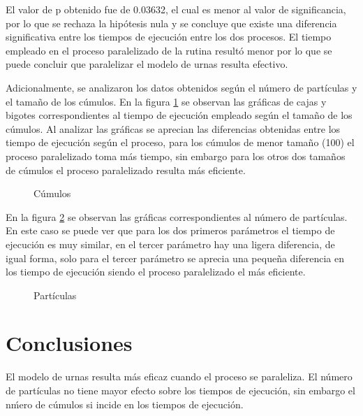 \documentclass{article}
\begin{document}
El valor de p obtenido fue de 0.03632, el cual es menor al valor de significancia, por lo que se rechaza la hip\'otesis nula y se concluye que existe una diferencia significativa entre los tiempos de ejecuci\'on entre los dos procesos.  El tiempo empleado en el proceso paralelizado de la rutina result\'o menor por lo que se puede concluir que paralelizar el modelo de urnas resulta efectivo.

Adicionalmente, se analizaron los datos obtenidos seg\'un el n\'umero de part\'iculas y el tama\~no de los c\'umulos.  En la figura \ref{f1} se observan las gr\'aficas de cajas y bigotes correspondientes al tiempo de ejecuci\'on empleado seg\'un el tama\~no de los c\'umulos.  Al analizar las gr\'aficas se aprecian las diferencias obtenidas entre los tiempo de ejecuci\'on seg\'un el proceso, para los c\'umulos de menor tama\~no (100) el proceso paralelizado toma m\'as tiempo, sin embargo para los otros dos tama\~nos de c\'umulos el proceso paralelizado resulta m\'as eficiente. 

\begin{figure}[htbp]
\centering
{}
\caption{C\'umulos} \label{f1}
\end{figure}

En la figura \ref{f2} se observan las gr\'aficas correspondientes al n\'umero de part\'iculas.  En este caso se puede ver que para los dos primeros par\'ametros el tiempo de ejecuci\'on es muy similar, en el tercer par\'ametro hay una ligera diferencia, de igual forma, solo para el tercer par\'ametro se aprecia una peque\~na diferencia en los tiempo de ejecuci\'on siendo el proceso paralelizado el m\'as eficiente.

\begin{figure}[htbp]

\caption{Part\'iculas} \label{f2}
\end{figure}



\section{Conclusiones}\label{con}   

El  modelo de urnas resulta m\'as eficaz cuando el proceso se paraleliza.  El n\'umero de part\'iculas no tiene mayor efecto sobre los tiempos de ejecuci\'on, sin embargo el n\'mero de c\'umulos si incide en los tiempos de ejecuci\'on.
\printbibliography
\end{document}
